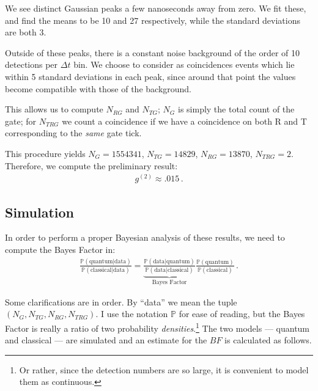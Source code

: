 \documentclass[main.tex]{subfiles}
\begin{document}
We see distinct Gaussian peaks a few nanoseconds away from zero. We fit these, and find the means to be 10 and 27 respectively, while the standard deviations are both 3.

Outside of these peaks, there is a constant noise background of the order of 10 detections per \(\Delta t\) bin.
We choose to consider as coincidences events which lie within 5 standard deviations in each peak, since around that point the values become compatible with those of the background.

This allows us to compute \(N_{RG}\) and \(N_{TG}\); \(N_G\) is simply the total count of the gate; for \(N_{TRG}\) we count a coincidence if we have a coincidence on both R and T corresponding to the \emph{same} gate tick. 

This procedure yields \(N_G = 1554341\), \(N_{TG}=14829\), \(N_{RG}=13870\), \(N_{TRG}=2\).
Therefore, we compute the preliminary result:
%
\begin{align}
g^{(2)} \approx \num{.015}
\,.
\end{align}

\subsection{Simulation}

In order to perform a proper Bayesian analysis of these results, we need to compute the Bayes Factor in: 
%
\begin{align}
\frac{\mathbb{P}(\text{quantum} | \text{data})}{\mathbb{P}(\text{classical} | \text{data})}
= \underbrace{\frac{\mathbb{P}(\text{data} | \text{quantum})}{\mathbb{P}(\text{data} | \text{classical})}}_{\text{Bayes Factor}}
\frac{\mathbb{P}(\text{quantum})}{\mathbb{P}(\text{classical})}
\,.
\end{align}

Some clarifications are in order. By ``data'' we mean the tuple \((N_G, N_{TG}, N_{RG}, N_{TRG})\). I use the notation \(\mathbb{P}\) for ease of reading, but the Bayes Factor is really a ratio of two probability \emph{densities}.\footnote{Or rather, since the detection numbers are so large, it is convenient to model them as continuous.}
The two models --- quantum and classical --- are simulated and an estimate for the \(BF\) is calculated as follows.
\end{document}
